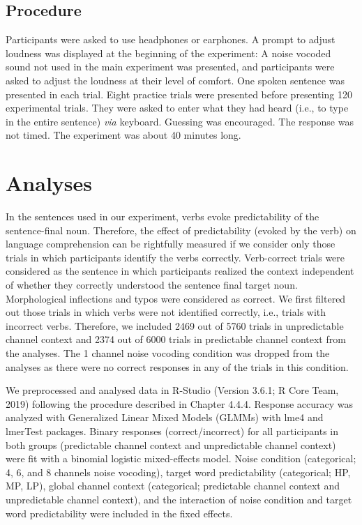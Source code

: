 \documentclass[a4paper, nobind]{templates/ociamthesis}
\begin{document}
\hypertarget{procedure-2}{%
\subsection{Procedure}\label{procedure-2}}

Participants were asked to use headphones or earphones.
A prompt to adjust loudness was displayed at the beginning of the experiment: A noise vocoded sound not used in the main experiment was presented, and participants were asked to adjust the loudness at their level of comfort.
One spoken sentence was presented in each trial.
Eight practice trials were presented before presenting 120 experimental trials.
They were asked to enter what they had heard (i.e., to type in the entire sentence) \emph{via} keyboard.
Guessing was encouraged.
The response was not timed.
The experiment was about 40 minutes long.

\hypertarget{analyses-2}{%
\section{Analyses}\label{analyses-2}}

In the sentences used in our experiment, verbs evoke predictability of the sentence-final noun.
Therefore, the effect of predictability (evoked by the verb) on language comprehension can be rightfully measured if we consider only those trials in which participants identify the verbs correctly.
Verb-correct trials were considered as the sentence in which participants realized the context independent of whether they correctly understood the sentence final target noun.
Morphological inflections and typos were considered as correct.
We first filtered out those trials in which verbs were not identified correctly, i.e., trials with incorrect verbs.
Therefore, we included 2469 out of 5760 trials in unpredictable channel context and 2374 out of 6000 trials in predictable channel context from the analyses.
The 1 channel noise vocoding condition was dropped from the analyses as there were no correct responses in any of the trials in this condition.

We preprocessed and analysed data in R-Studio (Version 3.6.1; R Core Team, 2019) following the procedure described in Chapter 4.4.4.
Response accuracy was analyzed with Generalized Linear Mixed Models (GLMMs) with lme4 \autocite{Bates2015} and lmerTest \autocite{Kuznetsova2017} packages.
Binary responses (correct/incorrect) for all participants in both groups (predictable channel context and unpredictable channel context) were fit with a binomial logistic mixed-effects model\autocite{Jaeger2006,Jaeger2008}.
Noise condition (categorical; 4, 6, and 8 channels noise vocoding), target word predictability (categorical; HP, MP, LP), global channel context (categorical; predictable channel context and unpredictable channel context), and the interaction of noise condition and target word predictability were included in the fixed effects.
\end{document}
